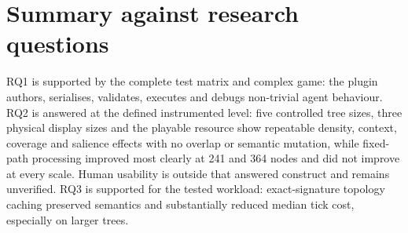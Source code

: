 \section{Summary against research questions}

RQ1 is supported by the complete test matrix and complex game: the plugin authors, serialises, validates, executes and debugs non-trivial agent behaviour. RQ2 is answered at the defined instrumented level: five controlled tree sizes, three physical display sizes and the playable resource show repeatable density, context, coverage and salience effects with no overlap or semantic mutation, while fixed-path processing improved most clearly at 241 and 364 nodes and did not improve at every scale. Human usability is outside that answered construct and remains unverified. RQ3 is supported for the tested workload: exact-signature topology caching preserved semantics and substantially reduced median tick cost, especially on larger trees.
